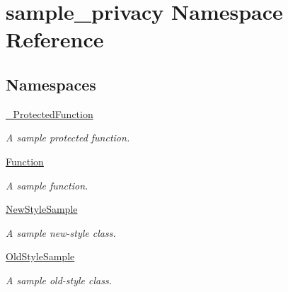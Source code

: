 \hypertarget{namespacesample__privacy}{\section{sample\-\_\-privacy Namespace Reference}
\label{namespacesample__privacy}
}
\subsection*{Namespaces}
\begin{DoxyCompactItemize}
\item 
\hyperlink{namespacesample__privacy_1_1___protected_function}{\-\_\-\-Protected\-Function}
\begin{DoxyCompactList}\small\item\em A sample protected function. \end{DoxyCompactList}\item 
\hyperlink{namespacesample__privacy_1_1_function}{Function}
\begin{DoxyCompactList}\small\item\em A sample function. \end{DoxyCompactList}\item 
\hyperlink{namespacesample__privacy_1_1_new_style_sample}{New\-Style\-Sample}
\begin{DoxyCompactList}\small\item\em A sample new-\/style class. \end{DoxyCompactList}\item 
\hyperlink{namespacesample__privacy_1_1_old_style_sample}{Old\-Style\-Sample}
\begin{DoxyCompactList}\small\item\em A sample old-\/style class. \end{DoxyCompactList}\end{DoxyCompactItemize}
